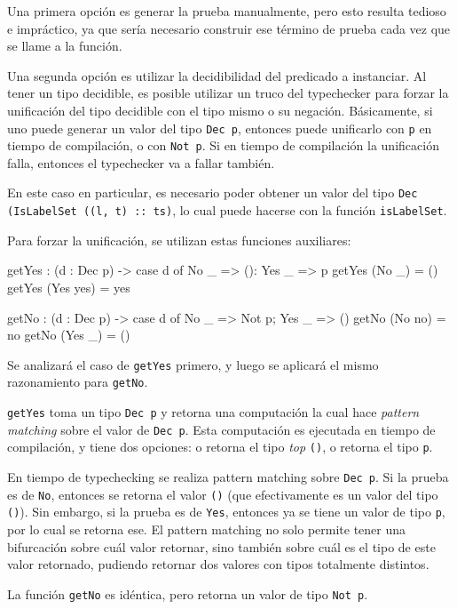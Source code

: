 Una primera opción es generar la prueba manualmente, pero esto resulta tedioso e impráctico, ya que sería necesario construir ese término de prueba cada vez que se llame a la función.

Una segunda opción es utilizar la decidibilidad del predicado a instanciar. Al tener un tipo decidible, es posible utilizar un truco del typechecker para forzar la unificación del tipo decidible con el tipo mismo o su negación. Básicamente, si uno puede generar un valor del tipo \texttt{Dec p}, entonces puede unificarlo con \texttt{p} en tiempo de compilación, o con \texttt{Not p}. Si en tiempo de compilación la unificación falla, entonces el typechecker va a fallar también.

En este caso en particular, es necesario poder obtener un valor del tipo \texttt{Dec (IsLabelSet ((l, t) :: ts)}, lo cual puede hacerse con la función \texttt{isLabelSet}.

Para forzar la unificación, se utilizan estas funciones auxiliares:

\begin{code}
getYes : (d : Dec p) ->
  case d of { No _ => (): Yes _ => p }
getYes (No _) = ()
getYes (Yes yes) = yes

getNo : (d : Dec p) ->
  case d of { No _ => Not p; Yes _ => () }
getNo (No no) = no
getNo (Yes _) = ()
\end{code}

Se analizará el caso de \texttt{getYes} primero, y luego se aplicará el mismo razonamiento para \texttt{getNo}.

\texttt{getYes} toma un tipo \texttt{Dec p} y retorna una computación la cual hace \textit{pattern matching} sobre el valor de \texttt{Dec p}. Esta computación es ejecutada en tiempo de compilación, y tiene dos opciones: o retorna el tipo \textit{top} \texttt{()}, o retorna el tipo \texttt{p}.

En tiempo de typechecking se realiza pattern matching sobre \texttt{Dec p}. Si la prueba es de \texttt{No}, entonces se retorna el valor \texttt{()} (que efectivamente es un valor del tipo \texttt{()}). Sin embargo, si la prueba es de \texttt{Yes}, entonces ya se tiene un valor de tipo \texttt{p}, por lo cual se retorna ese. El pattern matching no solo permite tener una bifurcación sobre cuál valor retornar, sino también sobre cuál es el tipo de este valor retornado, pudiendo retornar dos valores con tipos totalmente distintos.

La función \texttt{getNo} es idéntica, pero retorna un valor de tipo \texttt{Not p}.

